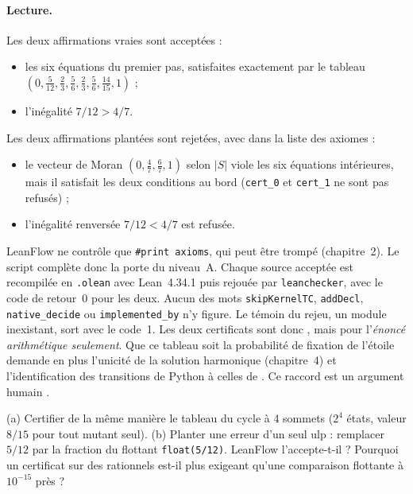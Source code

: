 \paragraph{Lecture.} Les deux affirmations vraies sont acceptées :
\begin{itemize}
\item les six équations du premier pas, satisfaites exactement par le tableau $(0,\tfrac5{12},\tfrac23,\tfrac56,
\tfrac23,\tfrac56,\tfrac{14}{15},1)$ ;
\item l'inégalité $7/12>4/7$.
\end{itemize}
Les deux affirmations plantées sont rejetées, avec  dans la liste des axiomes :
\begin{itemize}
\item le vecteur de Moran $(0,\tfrac47,\tfrac67,1)$ selon $|S|$ viole les six équations intérieures, mais il satisfait
les deux conditions au bord (\texttt{cert\_0} et \texttt{cert\_1} ne sont pas refusés) ;
\item l'inégalité renversée $7/12<4/7$ est refusée.
\end{itemize}
LeanFlow ne contrôle que \texttt{\#print axioms}, qui peut être trompé (chapitre~2). Le script complète donc la porte du
niveau~A. Chaque source acceptée est recompilée en \texttt{.olean} avec Lean~4.34.1 puis rejouée par
\texttt{leanchecker}, avec le code de retour~0 pour les deux. Aucun des mots \texttt{skipKernelTC}, \texttt{addDecl},
\texttt{native\_decide} ou \texttt{implemented\_by} n'y figure. Le témoin du rejeu, un module inexistant, sort avec le
code~1. Les deux certificats sont donc \tierA, mais pour l'\emph{énoncé arithmétique seulement}. Que ce tableau soit la
probabilité de fixation de l'étoile demande en plus l'unicité de la solution harmonique (chapitre~4) et l'identification
des transitions de Python à celles de . Ce raccord est un argument humain \tierC.

\begin{exercise}\label{appF:exo10}
(a) Certifier de la même manière le tableau du cycle à 4 sommets ($2^4$ états, valeur $8/15$ pour tout mutant
seul). (b) Planter une erreur d'un seul ulp : remplacer $5/12$ par la fraction du flottant \texttt{float(5/12)}.
LeanFlow l'accepte-t-il ? Pourquoi un certificat sur des rationnels est-il plus exigeant qu'une comparaison
flottante à $10^{-15}$ près ?
\end{exercise}

